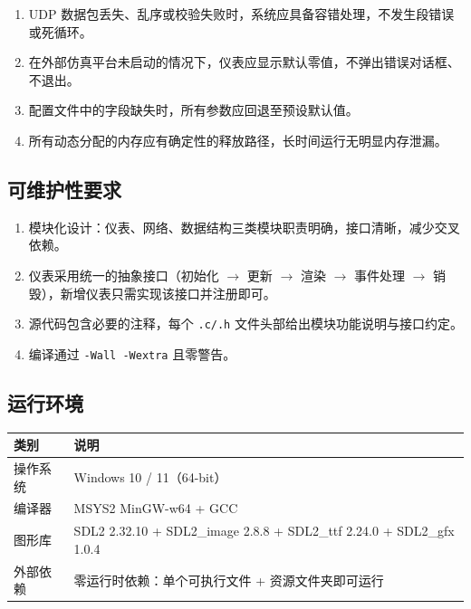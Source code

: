 \documentclass[12pt,a4paper]{ctexart}
\begin{document}
\begin{enumerate}[leftmargin=*]
    \item UDP 数据包丢失、乱序或校验失败时，系统应具备容错处理，不发生段错误或死循环。
    \item 在外部仿真平台未启动的情况下，仪表应显示默认零值，不弹出错误对话框、不退出。
    \item 配置文件中的字段缺失时，所有参数应回退至预设默认值。
    \item 所有动态分配的内存应有确定性的释放路径，长时间运行无明显内存泄漏。
\end{enumerate}

\subsection{可维护性要求}

\begin{enumerate}[leftmargin=*]
    \item 模块化设计：仪表、网络、数据结构三类模块职责明确，接口清晰，减少交叉依赖。
    \item 仪表采用统一的抽象接口（初始化 $\rightarrow$ 更新 $\rightarrow$ 渲染 $\rightarrow$ 事件处理 $\rightarrow$ 销毁），新增仪表只需实现该接口并注册即可。
    \item 源代码包含必要的注释，每个 \texttt{.c/.h} 文件头部给出模块功能说明与接口约定。
    \item 编译通过 \texttt{-Wall -Wextra} 且零警告。
\end{enumerate}

\subsection{运行环境}

\begin{table}[H]
\centering
\begin{tabular}{>{\raggedright\arraybackslash}p{4cm} >{\raggedright\arraybackslash}p{10cm}}
\toprule
\textbf{类别} & \textbf{说明} \\
\midrule
操作系统 & Windows 10 / 11（64-bit） \\
编译器 & MSYS2 MinGW-w64 + GCC \\
图形库 & SDL2 2.32.10 + SDL2\_image 2.8.8 + SDL2\_ttf 2.24.0 + SDL2\_gfx 1.0.4 \\
外部依赖 & 零运行时依赖：单个可执行文件 + 资源文件夹即可运行 \\
\bottomrule
\end{tabular}
\end{table}
\end{document}
